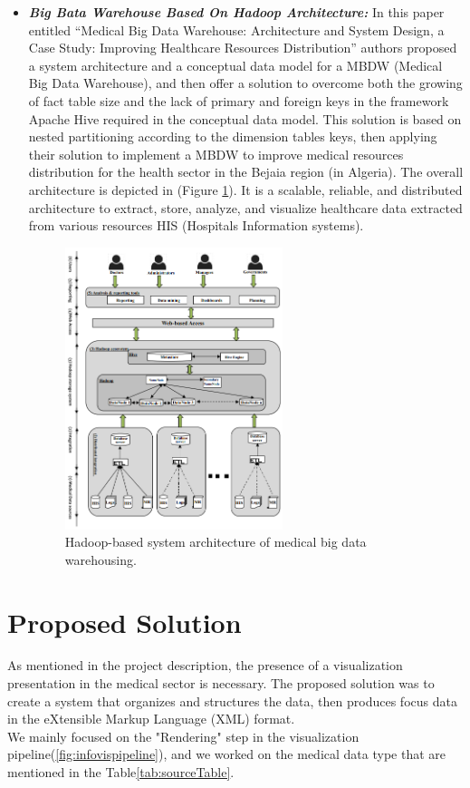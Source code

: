 \begin{itemize}
    \item \textbf{\textit{Big Bata Warehouse Based On Hadoop Architecture:}} In this paper\cite{sebaa2018medical} entitled “Medical Big Data Warehouse: Architecture and System Design, a Case Study: Improving Healthcare Resources Distribution” authors proposed a system architecture and a conceptual data model for a MBDW (Medical Big Data Warehouse), and then offer a solution to overcome both the growing of fact table size and the lack of primary and foreign keys in the framework Apache Hive required in the conceptual data model. This solution is based on nested partitioning according to the dimension tables keys, then  applying their solution to implement a MBDW to improve medical resources distribution for the health sector in the Bejaia region (in Algeria). 
    \bigbreak
    The overall architecture is depicted in (Figure \ref{fig:bigdatarelated}). It is a scalable, reliable, and distributed architecture to extract, store, analyze, and visualize healthcare data extracted from various resources HIS (Hospitals Information systems).
    \begin{figure}[h!]
      \center
      \includegraphics[width=0.60\textwidth]{images/chapter3/relatedwork/relatedworkHadoop.PNG}
      \caption{Hadoop-based system architecture of medical big data warehousing.}
      \label{fig:bigdatarelated}
    \end{figure}
\end{itemize}

\newpage
\section{Proposed Solution}
As mentioned in the project description, the presence of a visualization presentation in the medical sector is necessary. The proposed solution was to create a system that organizes and structures the data, then produces focus data in the eXtensible Markup Language (XML) format.\\
We mainly focused on the "Rendering" step in the visualization pipeline(\ref{fig:infovispipeline}), and we worked on the medical data type that are mentioned in the Table\ref{tab:sourceTable}.

